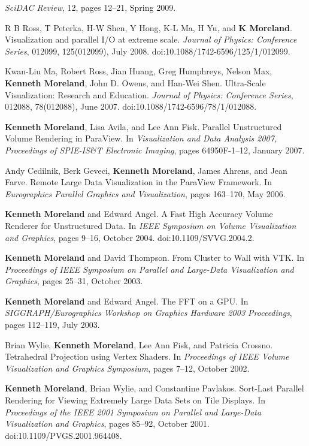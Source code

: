 \begin{enumerate}[label={[\arabic*]}, left=0pt]
  \emph{SciDAC Review}, 12, pages 12--21, Spring 2009.
\item  %
  R B Ross, T Peterka, H-W Shen, Y Hong, K-L Ma, H Yu, and \textbf{K Moreland}.
  Visualization and parallel {I/O} at extreme scale.
  \emph{Journal of Physics: Conference Series}, 012099, 125(012099), July 2008.
  doi:10.1088/1742-6596/125/1/012099.
\item  %
  Kwan-Liu Ma, Robert Ross, Jian Huang, Greg Humphreys, Nelson Max, \textbf{Kenneth Moreland}, John D. Owens, and Han-Wei Shen.
  Ultra-Scale Visualization: Research and Education.
  \emph{Journal of Physics: Conference Series}, 012088, 78(012088), June 2007.
  doi:10.1088/1742-6596/78/1/012088.
\item  %
  \textbf{Kenneth Moreland}, Lisa Avila, and Lee Ann Fisk.
  Parallel Unstructured Volume Rendering in ParaView.
  In \emph{Visualization and Data Analysis 2007, Proceedings of SPIE-IS\&T Electronic Imaging}, pages 64950F-1--12, January 2007.
\item  %
  Andy Cedilnik, Berk Geveci, \textbf{Kenneth Moreland}, James Ahrens, and Jean Farve.
  Remote Large Data Visualization in the {ParaView} Framework.
  In \emph{Eurographics Parallel Graphics and Visualization}, pages 163--170, May 2006.
\item  %
  \textbf{Kenneth Moreland} and Edward Angel.
  A Fast High Accuracy Volume Renderer for Unstructured Data.
  In \emph{IEEE Symposium on Volume Visualization and Graphics}, pages 9--16, October 2004.
  doi:10.1109/SVVG.2004.2.
\item  %
  \textbf{Kenneth Moreland} and David Thompson.
  From Cluster to Wall with {VTK}.
  In \emph{Proceedings of IEEE Symposium on Parallel and Large-Data Visualization and Graphics}, pages 25--31, October 2003.
\item  %
  \textbf{Kenneth Moreland} and Edward Angel.
  {The FFT on a GPU}.
  In \emph{SIGGRAPH/Eurographics Workshop on Graphics Hardware 2003 Proceedings}, pages 112--119, July 2003.
\item  %
  Brian Wylie, \textbf{Kenneth Moreland}, Lee Ann Fisk, and Patricia Crossno.
  Tetrahedral Projection using Vertex Shaders.
  In \emph{Proceedings of IEEE Volume Visualization and Graphics Symposium}, pages 7--12, October 2002.
\item  %
  \textbf{Kenneth Moreland}, Brian Wylie, and Constantine Pavlakos.
  Sort-Last Parallel Rendering for Viewing Extremely Large Data Sets on Tile Displays.
  In \emph{Proceedings of the IEEE 2001 Symposium on Parallel and Large-Data Visualization and Graphics}, pages 85--92, October 2001.
  doi:10.1109/PVGS.2001.964408.
\end{enumerate}